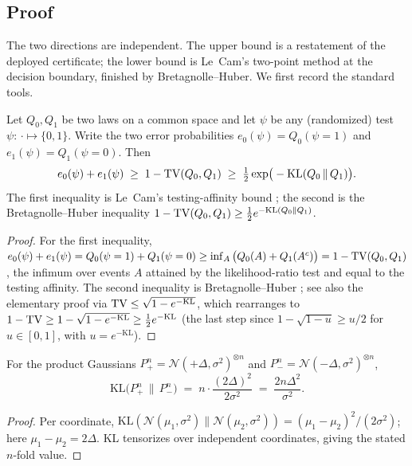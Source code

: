 \subsection{Proof}

The two directions are independent. The upper bound is a restatement of the deployed
certificate; the lower bound is Le~Cam's two-point method at the decision boundary, finished by
Bretagnolle--Huber. We first record the standard tools.

\begin{lemma}\label{lem:lecam-twosided}
Let $Q_0,Q_1$ be two laws on a common space and let $\psi$ be any (randomized) test
$\psi:\,\cdot\mapsto\{0,1\}$. Write the two error probabilities
$e_0(\psi)=Q_0(\psi=1)$ and $e_1(\psi)=Q_1(\psi=0)$. Then
\[
   e_0(\psi)+e_1(\psi)\;\ge\;1-\mathrm{TV}(Q_0,Q_1)\;\ge\;\tfrac12\exp\!\big(-\mathrm{KL}(Q_0\,\|\,Q_1)\big).
\]
The first inequality is Le~Cam's testing-affinity bound \cite{lecam1986asymptotic};
the second is the Bretagnolle--Huber inequality
$1-\mathrm{TV}(Q_0,Q_1)\ge\tfrac12 e^{-\mathrm{KL}(Q_0\|Q_1)}$.
\end{lemma}

\begin{proof}
For the first inequality, $e_0(\psi)+e_1(\psi)=Q_0(\psi=1)+Q_1(\psi=0)\ge
\inf_{A}\big(Q_0(A)+Q_1(A^c)\big)=1-\mathrm{TV}(Q_0,Q_1)$, the infimum over events $A$ attained by the
likelihood-ratio test and equal to the testing affinity. The second inequality is
Bretagnolle--Huber \cite[Ch.~2, Lemma~2.6]{tsybakov2009introduction}; see also the elementary proof via
$\mathrm{TV}\le\sqrt{1-e^{-\mathrm{KL}}}$, which rearranges to $1-\mathrm{TV}\ge1-\sqrt{1-e^{-\mathrm{KL}}}\ge
\tfrac12 e^{-\mathrm{KL}}$ (the last step since $1-\sqrt{1-u}\ge u/2$ for $u\in[0,1]$, with
$u=e^{-\mathrm{KL}}$).
\end{proof}

\begin{lemma}\label{lem:gauss-kl}
For the product Gaussians $P^n_{+}=\mathcal N(+\Delta,\sigma^2)^{\otimes n}$ and
$P^n_{-}=\mathcal N(-\Delta,\sigma^2)^{\otimes n}$,
\[
   \mathrm{KL}\big(P^n_{+}\,\|\,P^n_{-}\big)
   \;=\;n\cdot\frac{(2\Delta)^2}{2\sigma^2}
   \;=\;\frac{2n\Delta^2}{\sigma^2}.
\]
\end{lemma}
\begin{proof}
Per coordinate, $\mathrm{KL}(\mathcal N(\mu_1,\sigma^2)\|\mathcal N(\mu_2,\sigma^2))=
(\mu_1-\mu_2)^2/(2\sigma^2)$; here $\mu_1-\mu_2=2\Delta$. KL tensorizes over independent
coordinates, giving the stated $n$-fold value.
\end{proof}

